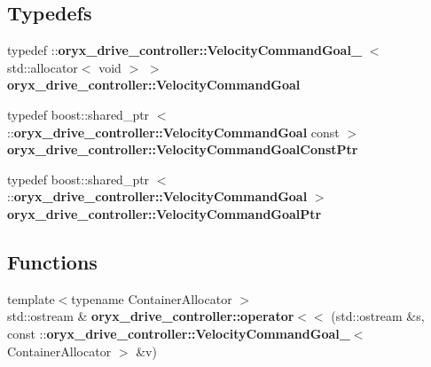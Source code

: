 \subsection*{\-Typedefs}
\begin{DoxyCompactItemize}
\item 
typedef \*
\-::{\bf oryx\-\_\-drive\-\_\-controller\-::\-Velocity\-Command\-Goal\-\_\-}\*
$<$ std\-::allocator$<$ void $>$ $>$ {\bf oryx\-\_\-drive\-\_\-controller\-::\-Velocity\-Command\-Goal}
\item 
typedef boost\-::shared\-\_\-ptr\*
$<$ \-::{\bf oryx\-\_\-drive\-\_\-controller\-::\-Velocity\-Command\-Goal} \*
const  $>$ {\bf oryx\-\_\-drive\-\_\-controller\-::\-Velocity\-Command\-Goal\-Const\-Ptr}
\item 
typedef boost\-::shared\-\_\-ptr\*
$<$ \-::{\bf oryx\-\_\-drive\-\_\-controller\-::\-Velocity\-Command\-Goal} $>$ {\bf oryx\-\_\-drive\-\_\-controller\-::\-Velocity\-Command\-Goal\-Ptr}
\end{DoxyCompactItemize}
\subsection*{\-Functions}
\begin{DoxyCompactItemize}
\item 
{\footnotesize template$<$typename Container\-Allocator $>$ }\\std\-::ostream \& {\bf oryx\-\_\-drive\-\_\-controller\-::operator$<$$<$} (std\-::ostream \&s, const \-::{\bf oryx\-\_\-drive\-\_\-controller\-::\-Velocity\-Command\-Goal\-\_\-}$<$ \-Container\-Allocator $>$ \&v)
\end{DoxyCompactItemize}
